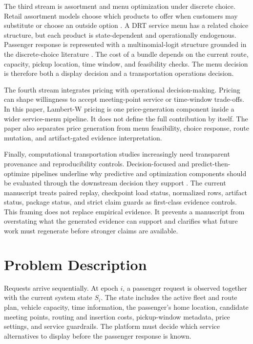 \documentclass[a4paper,fleqn,review]{cas-dc}
\begin{document}
The third stream is assortment and menu optimization under discrete choice.
Retail assortment models choose which products to offer when customers may
substitute or choose an outside option \citep{talluri2004revenue,rusmevichientong2010dynamic,desir2022capacitated}.
A DRT service menu has a related choice structure, but each product is
state-dependent and operationally endogenous. Passenger response is represented
with a multinomial-logit structure grounded in the discrete-choice literature
\citep{mcfadden1974conditional,ben1985discrete}. The cost of a bundle depends
on the current route, capacity, pickup location, time window, and feasibility
checks. The menu decision is therefore both a display decision and a
transportation operations decision.

The fourth stream integrates pricing with operational decision-making.
Pricing can shape willingness to accept meeting-point service or time-window
trade-offs. In this paper, Lambert-W pricing is one price-generation component
inside a wider service-menu pipeline. It does not define the full contribution
by itself. The paper also separates price generation from menu feasibility,
choice response, route mutation, and artifact-gated evidence interpretation.

Finally, computational transportation studies increasingly need transparent
provenance and reproducibility controls. Decision-focused and
predict-then-optimize pipelines underline why predictive and optimization
components should be evaluated through the downstream decision they support
\citep{elmachtoub2022smart}. The current manuscript treats paired replay,
checkpoint load status, normalized rows, artifact status, package status, and
strict claim guards as first-class evidence controls. This framing does not
replace empirical evidence. It prevents a manuscript from overstating what the
generated evidence can support and clarifies what future work must regenerate
before stronger claims are available.

\section{Problem Description}

Requests arrive sequentially. At epoch $i$, a passenger request is observed
together with the current system state $S_i$. The state includes the active
fleet and route plan, vehicle capacity, time information, the passenger's home
location, candidate meeting points, routing and insertion costs, pickup-window
metadata, price settings, and service guardrails. The platform must decide
which service alternatives to display before the passenger response is known.
\end{document}
